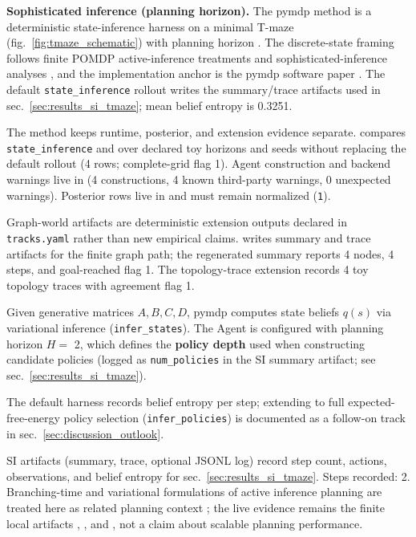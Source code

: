 \documentclass[
  english,
]{article}
\begin{document}
\textbf{Sophisticated inference (planning horizon).} The pymdp method is
a deterministic state-inference harness on a minimal T-maze
(fig.~\ref{fig:tmaze_schematic}) with planning horizon
. The discrete-state framing follows finite
POMDP active-inference treatments and sophisticated-inference analyses
\citep{dacosta2020discrete, smith2022tutorial, friston2021sophisticated, dacosta2023reward},
and the implementation anchor is the pymdp software paper
\citep{pymdp2024}. The default \texttt{state\_inference} rollout writes
the summary/trace artifacts used in sec.~\ref{sec:results_si_tmaze};
mean belief entropy is 0.3251.

The method keeps runtime, posterior, and extension evidence separate.
 compares
\texttt{state\_inference} and  over declared
toy horizons and seeds without replacing the default rollout (4 rows;
complete-grid flag 1). Agent construction and backend warnings live in
 (4
constructions, 4 known third-party warnings, 0 unexpected warnings).
Posterior rows live in
 and must remain
normalized (\texttt{1}).

Graph-world artifacts are deterministic extension outputs declared in
\texttt{tracks.yaml} rather than new empirical claims.
 writes summary and trace
artifacts for the finite graph path; the regenerated summary reports 4
nodes, 4 steps, and goal-reached flag 1. The topology-trace extension
records 4 toy topology traces with agreement flag 1.

Given generative matrices \(A,B,C,D\), pymdp computes state beliefs
\(q(s)\) via variational inference (\texttt{infer\_states}). The Agent
is configured with planning horizon \(H =\) 2, which defines the
\textbf{policy depth} used when constructing candidate policies (logged
as \texttt{num\_policies} in the SI summary artifact; see
sec.~\ref{sec:results_si_tmaze}).

The default harness records belief entropy per step; extending to full
expected-free-energy policy selection (\texttt{infer\_policies}) is
documented as a follow-on track in sec.~\ref{sec:discussion_outlook}.

SI artifacts (summary, trace, optional JSONL log) record step count,
actions, observations, and belief entropy for
sec.~\ref{sec:results_si_tmaze}. Steps recorded: 2. Branching-time and
variational formulations of active inference planning are treated here
as related planning context
\citep{champion2021branching, nuijten2026efeplanning}; the live evidence
remains the finite local artifacts ,
, and
, not a claim about scalable
planning performance.
\end{document}
